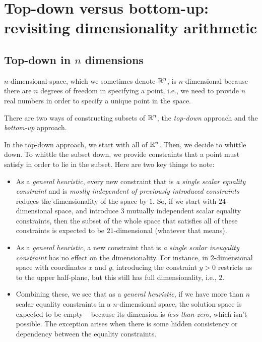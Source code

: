 \documentclass[10pt]{amsart}
\begin{document}
\section{Top-down versus bottom-up: revisiting dimensionality arithmetic}

\subsection{Top-down in $n$ dimensions}

$n$-dimensional space, which we sometimes denote $\mathbb{R}^n$, is
$n$-dimensional because there are $n$ degrees of freedom in specifying
a point, i.e., we need to provide $n$ real numbers in order to specify
a unique point in the space.

There are two ways of constructing subsets of $\mathbb{R}^n$, the {\em
top-down} approach and the {\em bottom-up} approach.

In the top-down approach, we start with all of $\mathbb{R}^n$. Then, we decide
to whittle down. To whittle the subset down, we provide constraints
that a point must satisfy in order to lie in the subset. Here are two
key things to note:

\begin{itemize}
\item As a {\em general heuristic}, every new constraint that is {\em
  a single scalar equality constraint} and is {\em mostly independent
  of previously introduced constraints} reduces the dimensionality of
  the space by $1$. So, if we start with $24$-dimensional space, and
  introduce $3$ mutually independent scalar equality constraints, then
  the subset of the whole space that satisfies all of these
  constraints is expected to be $21$-dimensional (whatever that means).
\item As a {\em general heuristic}, a new constraint that is {\em a
  single scalar ineuqality constraint} has no effect on the
  dimensionality. For instance, in $2$-dimensional space with
  coordinates $x$ and $y$, introducing the constraint $y > 0$
  restricts us to the upper half-plane, but this still has full
  dimensionality, i.e., $2$.
\item Combining these, we see that as a {\em general heuristic}, if we
  have more than $n$ scalar equality constraints in a $n$-dimensional
  space, the solution space is expected to be empty -- because its
  dimension is {\em less than zero}, which isn't possible. The
  exception arises when there is some hidden consistency or dependency
  between the equality constraints.
\end{itemize}
\end{document}
